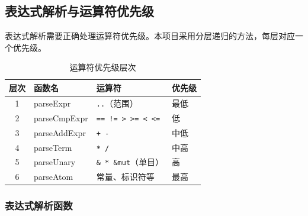 \documentclass[12pt,a4paper]{ctexart}
\begin{document}
\subsection{表达式解析与运算符优先级}

表达式解析需要正确处理运算符优先级。本项目采用分层递归的方法，每层对应一个优先级。

\begin{table}[H]
\centering
\caption{运算符优先级层次}
\begin{tabular}{|c|l|l|l|}
\hline
\textbf{层次} & \textbf{函数名} & \textbf{运算符} & \textbf{优先级} \\
\hline
1 & parseExpr & \texttt{..}（范围） & 最低 \\
\hline
2 & parseCmpExpr & \texttt{== != > >= < <=} & 低 \\
\hline
3 & parseAddExpr & \texttt{+ -} & 中低 \\
\hline
4 & parseTerm & \texttt{* /} & 中高 \\
\hline
5 & parseUnary & \texttt{\& * \&mut}（单目） & 高 \\
\hline
6 & parseAtom & 常量、标识符等 & 最高 \\
\hline
\end{tabular}
\end{table}

\subsubsection{表达式解析函数}
\end{document}
